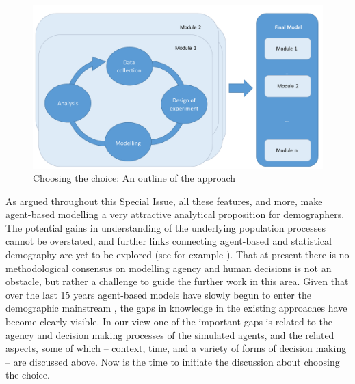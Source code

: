 \documentclass{article}
\begin{document}
\begin{figure}
\includegraphics[width=\textwidth]{process}
\caption{Choosing the choice: An outline of the approach \label{fig:approach}}
\end{figure}

As argued throughout this Special Issue, all these features, and more, make agent-based modelling a very attractive analytical proposition for demographers. The potential gains in understanding of the underlying population processes cannot be overstated, and further links connecting agent-based and statistical demography are yet to be explored (see for example \citet{Bijak2016}). That at present there is no methodological consensus on modelling agency and human decisions is not an obstacle, but rather a challenge to guide the further work in this area. Given that over the last 15 years agent-based models have slowly begun to enter the demographic mainstream \citep{Billari2003,VanBavel2016}, the gaps in knowledge in the existing approaches have become clearly visible. In our view one of the important gaps is related to the agency and decision making processes of the simulated agents, and the related aspects, some of which – context, time, and a variety of forms of decision making – are discussed above. Now is the time to initiate the discussion about choosing the choice. 



\end{document}
